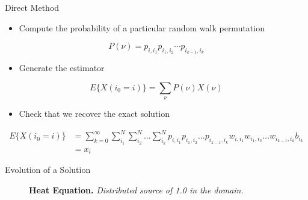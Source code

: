 \documentclass{beamer}
\begin{document}
\begin{frame}{Direct Method}

  \begin{itemize}
  \item Compute the probability of a particular random walk
    permutation
  \end{itemize}

  \[
  P(\nu) = p_{i,i_1} p_{i_1,i_2} \cdots p_{i_{k-1},i_k}
  \]

  \begin{itemize}
  \item Generate the estimator
  \end{itemize}

  \[
  E\{X(i_0 = i)\} = \sum_{\nu} P(\nu) X(\nu)
  \]

  \begin{itemize}
  \item Check that we recover the exact solution
  \end{itemize}
  
  {\small
  \[
  \begin{split}
    E\{X(i_0 = i)\}
    &=\sum_{k=0}^{\infty}\sum_{i_1}^{N}\sum_{i_2}^{N}\ldots
    \sum_{i_k}^{N} p_{i,i_1}p_{i_1,i_2}\ldots p_{i_{k-1},i_k}
    w_{i,i_1}w_{i_1,i_2}\ldots w_{i_{k-1},i_k} b_{i_k}\\ &= x_i
  \end{split}
  \]
  }

\end{frame}

\begin{frame}{Evolution of a Solution}

  \begin{figure}[htpb!]
    \begin{center}
      \scalebox{1.0}{  }
    \end{center}
    \caption{\textbf{Heat Equation.}
      \textit{Distributed source of 1.0 in the domain.}}
  \end{figure}

\end{frame}
\end{document}
